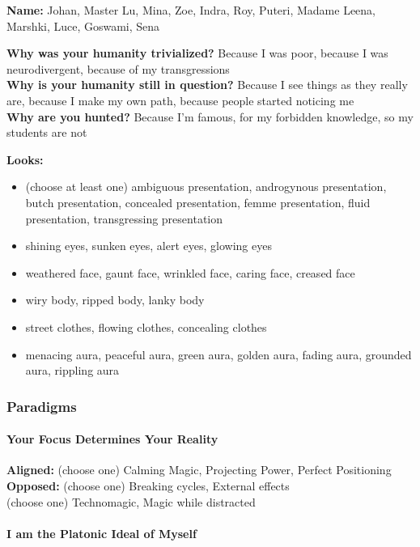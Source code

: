 \documentclass[
]{article}
\providecommand{\tightlist}{%
  \setlength{\itemsep}{0pt}\setlength{\parskip}{0pt}}
\begin{document}
\textbf{Name:} Johan, Master Lu, Mina, Zoe, Indra, Roy, Puteri, Madame
Leena, Marshki, Luce, Goswami, Sena

\textbf{Why was your humanity trivialized?} Because I was poor, because
I was neurodivergent, because of my transgressions\\
\textbf{Why is your humanity still in question?} Because I see things as
they really are, because I make my own path, because people started
noticing me\\
\textbf{Why are you hunted?} Because I'm famous, for my forbidden
knowledge, so my students are not

\textbf{Looks:}

\begin{itemize}
\tightlist
\item
  (choose at least one) ambiguous presentation, androgynous
  presentation, butch presentation, concealed presentation, femme
  presentation, fluid presentation, transgressing presentation
\item
  shining eyes, sunken eyes, alert eyes, glowing eyes
\item
  weathered face, gaunt face, wrinkled face, caring face, creased face
\item
  wiry body, ripped body, lanky body
\item
  street clothes, flowing clothes, concealing clothes
\item
  menacing aura, peaceful aura, green aura, golden aura, fading aura,
  grounded aura, rippling aura
\end{itemize}

\hypertarget{paradigms-1}{%
\subsubsection{Paradigms}\label{paradigms-1}}

\hypertarget{your-focus-determines-your-reality}{%
\paragraph{Your Focus Determines Your
Reality}\label{your-focus-determines-your-reality}}

\textbf{Aligned:} (choose one) Calming Magic, Projecting Power, Perfect
Positioning\\
\textbf{Opposed:} (choose one) Breaking cycles, External effects\\
(choose one) Technomagic, Magic while distracted

\hypertarget{i-am-the-platonic-ideal-of-myself}{%
\paragraph{I am the Platonic Ideal of
Myself}\label{i-am-the-platonic-ideal-of-myself}}
\end{document}
